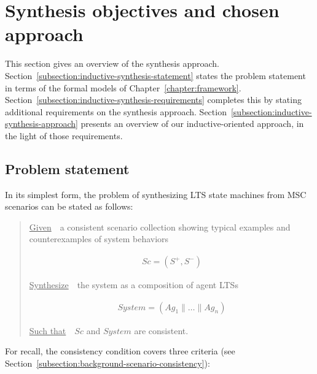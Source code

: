 \section{Synthesis objectives and chosen approach\label{section:inductive-objectives-and-approach}}

This section gives an overview of the synthesis approach. Section~\ref{subsection:inductive-synthesis-statement} states the problem statement in terms of the formal models of Chapter~\ref{chapter:framework}. Section~\ref{subsection:inductive-synthesis-requirements} completes this by stating additional requirements on the synthesis approach. Section~\ref{subsection:inductive-synthesis-approach} presents an overview of our inductive-oriented approach, in the light of those requirements.


\subsection{Problem statement\label{subsection:inductive-synthesis-statement}}

In its simplest form, the problem of synthesizing LTS state machines from MSC scenarios can be stated as follows:

\begin{quotation}
\noindent \underline{Given}~~a consistent scenario collection showing typical examples and counterexamples of system behaviors

\vspace{-0.7cm}
\begin{align*}
Sc = (S^+,S^-)
\end{align*}

\vspace{-0.2cm}
\noindent \underline{Synthesize}~~the system as a composition of agent LTSs

\vspace{-0.7cm}
\begin{align*}
System = (Ag_1 \parallel \ldots \parallel Ag_n)
\end{align*}

\vspace{-0.2cm}
\noindent \underline{Such that}~~$Sc$ and $System$ are consistent.
\end{quotation}

\noindent For recall, the consistency condition covers three criteria (see Section~\ref{subsection:background-scenario-consistency}):


